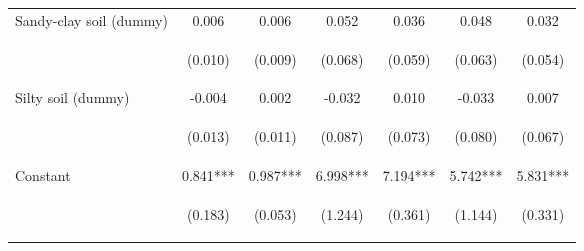 \begin{center}
\begin{tabular}{lcccccc}
Sandy-clay soil (dummy) & 0.006 & 0.006 & 0.052 & 0.036 & 0.048 & 0.032 \\
\vspace{4pt} & \begin{footnotesize}(0.010)\end{footnotesize} & \begin{footnotesize}(0.009)\end{footnotesize} & \begin{footnotesize}(0.068)\end{footnotesize} & \begin{footnotesize}(0.059)\end{footnotesize} & \begin{footnotesize}(0.063)\end{footnotesize} & \begin{footnotesize}(0.054)\end{footnotesize} \\
Silty soil (dummy) & -0.004 & 0.002 & -0.032 & 0.010 & -0.033 & 0.007 \\
\vspace{4pt} & \begin{footnotesize}(0.013)\end{footnotesize} & \begin{footnotesize}(0.011)\end{footnotesize} & \begin{footnotesize}(0.087)\end{footnotesize} & \begin{footnotesize}(0.073)\end{footnotesize} & \begin{footnotesize}(0.080)\end{footnotesize} & \begin{footnotesize}(0.067)\end{footnotesize} \\
Constant & 0.841*** & 0.987*** & 6.998*** & 7.194*** & 5.742*** & 5.831*** \\
 & \begin{footnotesize}(0.183)\end{footnotesize} & \begin{footnotesize}(0.053)\end{footnotesize} & \begin{footnotesize}(1.244)\end{footnotesize} & \begin{footnotesize}(0.361)\end{footnotesize} & \begin{footnotesize}(1.144)\end{footnotesize} & \begin{footnotesize}(0.331)\end{footnotesize} \\

\end{tabular}
\end{center}
